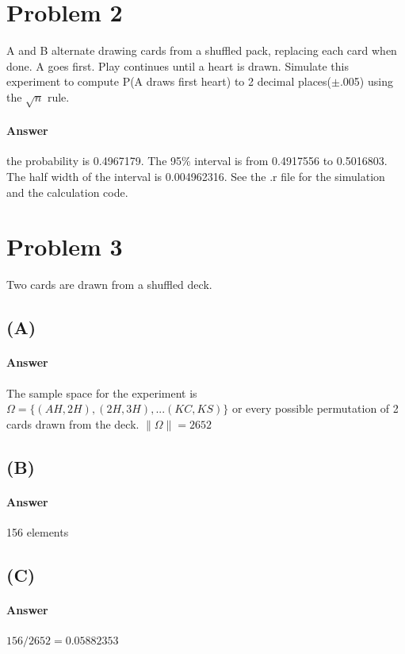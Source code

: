 \documentclass[12pt]{article}
\begin{document}
\section*{Problem 2}
A and B alternate drawing cards from a shuffled pack, replacing each card when done.  A goes first.  Play continues until a heart is drawn.  Simulate this  experiment  to  compute  P(A  draws  first  heart)  to  2  decimal  places($\pm$.005) using the $\sqrt{n}$ rule.

 \paragraph{Answer}
the probability is  0.4967179.
The 95\% interval is from  0.4917556 to 0.5016803.
The half width of the interval is  0.004962316.
See the .r file for the simulation and the calculation code.

\section*{Problem 3}
Two cards are drawn from a shuffled deck.

\subsection*{(A)}

\paragraph{Answer}
The sample space for the experiment is $\Omega=\{(AH,2H), (2H,3H), ... (KC, KS)\}$ or every possible permutation of 2 cards drawn from the deck.
$\|\Omega\| = 2652$

\subsection*{(B)}

\paragraph{Answer}
156 elements

\subsection*{(C)}

\paragraph{Answer}
$156/2652 = 0.05882353$
\end{document}
